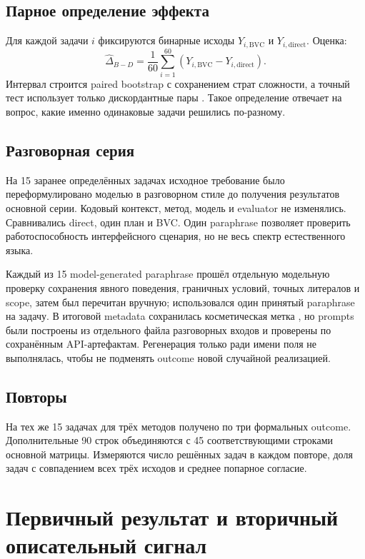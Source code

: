 \documentclass[11pt]{article}
\begin{document}
\subsection{Парное определение эффекта}

Для каждой задачи \(i\) фиксируются бинарные исходы
\(Y_{i,\mathrm{BVC}}\) и \(Y_{i,\mathrm{direct}}\). Оценка:
\[
\widehat{\Delta}_{B-D}
=\frac{1}{60}\sum_{i=1}^{60}
(Y_{i,\mathrm{BVC}}-Y_{i,\mathrm{direct}}).
\]
Интервал строится paired bootstrap с сохранением страт сложности, а точный
тест использует только дискордантные пары \cite{mcnemar1947,efron1993bootstrap}.
Такое определение отвечает на вопрос, какие именно одинаковые задачи
решились по-разному.

\subsection{Разговорная серия}

На 15 заранее определённых задачах исходное требование было переформулировано
моделью в разговорном стиле до получения результатов основной серии. Кодовый
контекст, метод, модель и evaluator не изменялись.
Сравнивались direct, один план и BVC. Один paraphrase позволяет проверить
работоспособность интерфейсного сценария, но не весь спектр естественного
языка.

Каждый из 15 model-generated paraphrase прошёл отдельную модельную проверку
сохранения явного поведения, граничных условий, точных литералов и scope,
затем был перечитан вручную; использовался один принятый paraphrase на задачу.
В итоговой metadata сохранилась косметическая метка
, но prompts были построены из отдельного
файла разговорных входов и проверены по сохранённым API-артефактам.
Регенерация только ради имени поля не выполнялась, чтобы не подменять outcome
новой случайной реализацией.

\subsection{Повторы}

На тех же 15 задачах для трёх методов получено по три формальных outcome.
Дополнительные 90 строк объединяются с 45 соответствующими строками основной
матрицы. Измеряются число решённых задач в каждом повторе, доля задач с
совпадением всех трёх исходов и среднее попарное согласие.

\section{Первичный результат и вторичный описательный сигнал}
\end{document}
